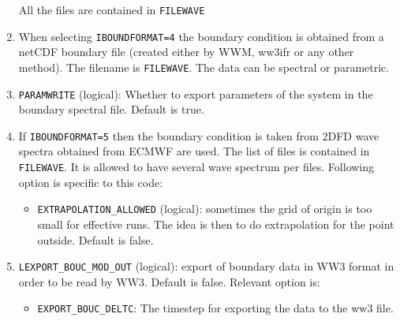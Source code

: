 \documentclass[12pt]{amsart}
\begin{document}
\begin{enumerate}
\begin{itemize}
  \end{itemize}
  All the files are contained in {\tt FILEWAVE}
\item When selecting {\tt IBOUNDFORMAT=4} the boundary condition is obtained from a netCDF boundary file (created either by WWM, ww3ifr or any other method). The filename is {\tt FILEWAVE}. The data can be spectral or parametric.
\item {\tt PARAMWRITE} (logical): Whether to export parameters of the system in the boundary spectral file. Default is true.
\item If {\tt IBOUNDFORMAT=5} then the boundary condition is taken from 2DFD wave spectra obtained from ECMWF are used. The list of files is contained in {\tt FILEWAVE}. It is allowed to have several wave spectrum per files. Following option is specific to this code:
  \begin{itemize}
  \item {\tt EXTRAPOLATION\_ALLOWED} (logical): sometimes the grid of origin is too small for effective runs. The idea is then to do extrapolation for the point outside. Default is false.
  
  \end{itemize}
\item {\tt LEXPORT\_BOUC\_MOD\_OUT} (logical): export of boundary data in WW3 format in order to be read by WW3. Default is false. Relevant option is:
  \begin{itemize}
  \item {\tt EXPORT\_BOUC\_DELTC}: The timestep for exporting the data to the ww3 file.
  \end{itemize}
  

\end{enumerate}
\end{document}
